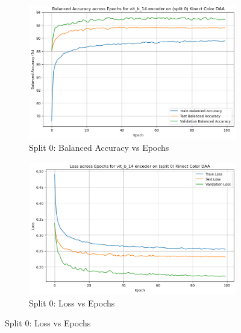 \begin{figure}[htbp]
    \centering
    \begin{subfigure}[b]{0.45\textwidth}
        \includegraphics[width=\textwidth]{Images_Thesis/Tensboard_runs_images_all/Experiment_03_Sel_Sup_D_B_no_Aug/Split_0/output_bal_acc_split_0_d_b_ssl.png}
        \caption{Split 0: Balanced Accuracy vs Epochs}
        \label{fig:Exp_4_01}
    \end{subfigure}
    \hfill %
    \begin{subfigure}[b]{0.45\textwidth}
        \includegraphics[width=\textwidth]{Images_Thesis/Tensboard_runs_images_all/Experiment_03_Sel_Sup_D_B_no_Aug/Split_0/output_loss_split_0_d_b_ssl.png}
        \caption{Split 0: Loss vs Epochs}
        \label{fig:Exp_4_02}
    \end{subfigure}


\end{figure}
